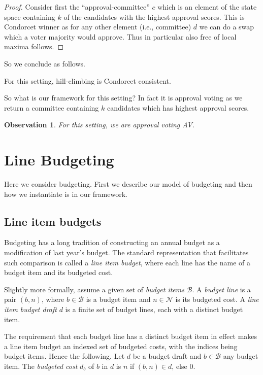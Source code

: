 \documentclass[sigconf]{aamas}  %
\newtheorem{observation}{Observation}
\newcommand{\calB}{\mathcal{B}}
\begin{document}
\begin{proof}
%
Consider first the ``approval-committee'' $c$ which is an element of the state space containing $k$ of the candidates with the highest approval scores.
This is Condorcet winner as for any other element (i.e., committee) $d$ we can do a swap which a voter majority would approve. Thus in particular also free of local maxima follows.
%
\end{proof}

So we conclude as follows.

\begin{corollary}
  For this setting, hill-climbing is Condorcet consistent.
\end{corollary}

So what is our framework for this setting? In fact it is approval voting as we return a committee containing $k$ candidates which has highest approval scores.

\begin{observation}
For this setting, we are approval voting AV.
\end{observation}


\section{Line Budgeting}
\label{section:e-process budgeting}

Here we consider budgeting. First we describe our model of budgeting and then how we instantiate is in our framework.


\subsection{Line item budgets}

Budgeting has a long tradition of constructing an annual budget as a modification of last year's budget.  The standard representation that facilitates such comparison is called a \emph{line item budget}, where each line has the name of a budget item and its budgeted cost.

Slightly more formally,
assume a given set of \emph{budget items} $\calB$. A \emph{budget line} is a pair $(b,n)$, where $b \in \calB$ is a budget item and $n \in \mathcal{N}$ is its budgeted cost.  A \emph{line item budget draft} $d$ is a finite set of budget lines, each with a distinct budget item.

The requirement that each budget line has a distinct budget item in effect makes a line item budget an indexed set of budgeted costs, with the indices being
budget items.  Hence the following.
Let $d$ be a budget draft and $b \in \calB$  any budget item. The \emph{budgeted cost} $d_b$ of $b$ in $d$ is $n$ if $(b,n) \in d$, else 0.
\end{document}
